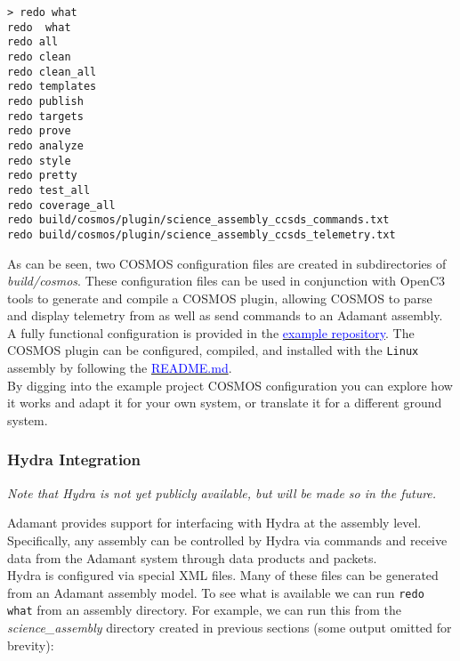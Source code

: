 \vspace{5mm} %
\begin{verbatim}
> redo what
redo  what
redo all
redo clean
redo clean_all
redo templates
redo publish
redo targets
redo prove
redo analyze
redo style
redo pretty
redo test_all
redo coverage_all
redo build/cosmos/plugin/science_assembly_ccsds_commands.txt
redo build/cosmos/plugin/science_assembly_ccsds_telemetry.txt
\end{verbatim}
\vspace{5mm} %

As can be seen, two COSMOS configuration files are created in subdirectories of \textit{build/cosmos}. These configuration files can be used in conjunction with OpenC3 tools to generate and compile a COSMOS plugin, allowing COSMOS to parse and display telemetry from as well as send commands to an Adamant assembly. \\

A fully functional configuration is provided in the \href{https://github.com/lasp/adamant_example/tree/main/src/assembly/linux/main/}{\textcolor{blue}{example repository}}. The COSMOS plugin can be configured, compiled, and installed with the \texttt{Linux} assembly by following the \href{https://github.com/lasp/adamant_example/tree/main/src/assembly/linux/main/README.md}{\textcolor{blue}{README.md}}. \\

By digging into the example project COSMOS configuration you can explore how it works and adapt it for your own system, or translate it for a different ground system.

\subsubsection{Hydra Integration}

\textit{Note that Hydra is not yet publicly available, but will be made so in the future.}

Adamant provides support for interfacing with Hydra at the assembly level. Specifically, any assembly can be controlled by Hydra via commands and receive data from the Adamant system through data products and packets. \\

Hydra is configured via special XML files. Many of these files can be generated from an Adamant assembly model. To see what is available we can run \texttt{redo what} from an assembly directory. For example, we can run this from the \textit{science\_assembly} directory created in previous sections (some output omitted for brevity):

